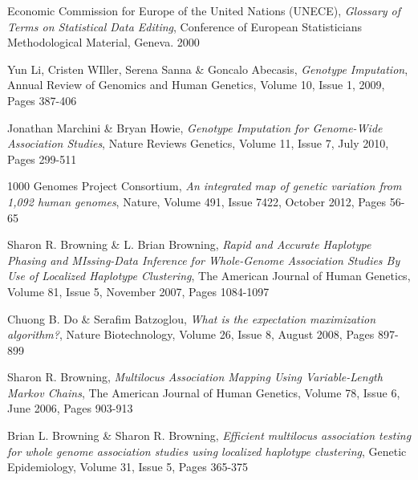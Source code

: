 \documentclass[a4paper,10pt,twoside,abstraction,titlepage]{article}
\begin{document}
\begin{thebibliography}{99}

 Economic Commission for Europe of the United Nations (UNECE), \emph{Glossary of Terms on Statistical Data Editing}, Conference of European Statisticians Methodological Material, Geneva. 2000

 Yun Li, Cristen WIller, Serena Sanna \& Goncalo Abecasis, \emph{Genotype Imputation}, Annual Review of Genomics and Human Genetics, Volume 10, Issue 1,  2009, Pages 387-406

 Jonathan Marchini \& Bryan Howie, \emph{Genotype Imputation for Genome-Wide Association Studies}, Nature Reviews Genetics, Volume 11, Issue 7, July 2010, Pages 299-511

 1000 Genomes Project Consortium, \emph{An integrated map of genetic variation from 1,092 human genomes}, Nature, Volume 491, Issue 7422, October 2012, Pages 56-65

 Sharon R. Browning \& L. Brian Browning, \emph{Rapid and Accurate Haplotype Phasing and MIssing-Data Inference for Whole-Genome Association Studies By Use of Localized Haplotype Clustering}, The American Journal of Human Genetics, Volume 81, Issue 5, November 2007, Pages 1084-1097

 Chuong B. Do \& Serafim Batzoglou, \emph{What is the expectation maximization algorithm?}, Nature Biotechnology, Volume 26, Issue 8, August 2008, Pages 897-899

 Sharon R. Browning, \emph{Multilocus Association Mapping Using Variable-Length Markov Chains}, The American Journal of Human Genetics, Volume 78, Issue 6, June 2006, Pages 903-913

 Brian L. Browning \& Sharon R. Browning, \emph{Efficient multilocus association testing for whole genome association studies using localized haplotype clustering},  Genetic Epidemiology, Volume 31, Issue 5, Pages 365-375




\end{thebibliography}
\end{document}
